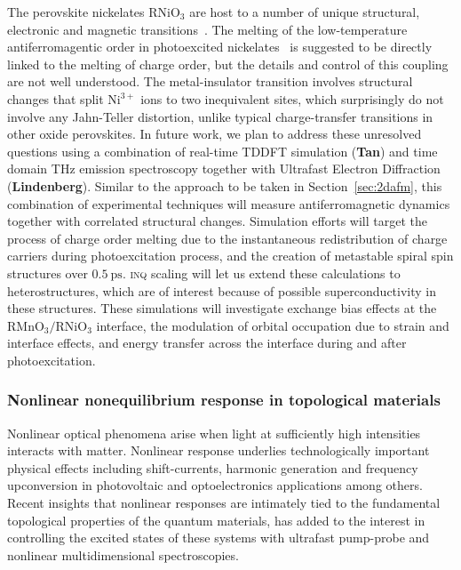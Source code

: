 The perovskite nickelates \(\mathrm{RNiO_3}\) are host to a number of unique structural, electronic and magnetic transitions~\cite{Giovannetti2009,Hampel2017,Beyerlein2018}.
The melting of the low-temperature antiferromagentic order in photoexcited nickelates~\cite{Caviglia2013} is suggested to be directly linked to the melting of charge order, but the details and control of this coupling are not well understood. 
The metal-insulator transition involves structural changes that split \(\mathrm{Ni^{3+}}\) ions to two inequivalent sites, which surprisingly do not involve any Jahn-Teller distortion, unlike typical charge-transfer transitions in other oxide perovskites. 
In future work, we plan to address these unresolved questions using a combination of real-time TDDFT simulation ({\bf Tan}) and time domain THz emission spectroscopy together with Ultrafast Electron Diffraction ({\bf Lindenberg}). 
Similar to the approach to be taken in Section~\ref{sec:2dafm}, this combination of experimental techniques will measure antiferromagnetic dynamics together with correlated structural changes. 
Simulation efforts will target the process of charge order melting due to the instantaneous redistribution of charge carriers during photoexcitation process, and the creation of metastable spiral spin structures over \(0.5~\mathrm{ps}\). 
\textsc{inq} scaling will let us extend these calculations to heterostructures, which are of interest because of possible superconductivity in these structures. These simulations will investigate exchange bias effects at the \(\mathrm{RMnO_3}/\mathrm{RNiO_3}\) interface, the modulation of orbital occupation due to strain and interface effects, and energy transfer across the interface during and after photoexcitation.

\subsubsection{Nonlinear nonequilibrium response in topological materials}

Nonlinear optical phenomena arise when light at sufficiently high intensities interacts with matter.
Nonlinear response underlies technologically important physical effects including shift-currents, harmonic generation and frequency upconversion in photovoltaic and optoelectronics applications among others.
Recent insights that nonlinear responses are intimately tied to the fundamental topological properties of the quantum materials, has added to the interest in controlling the excited states of these systems with ultrafast pump-probe and nonlinear multidimensional spectroscopies.

